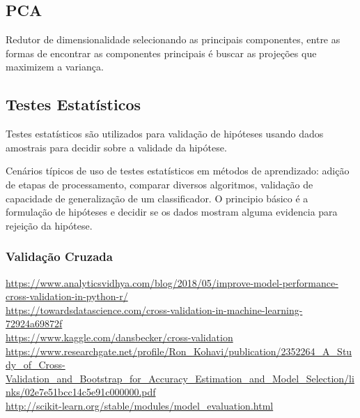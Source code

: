 \documentclass[12pt]{article}
\begin{document}
\subsection{PCA}

	Redutor de dimensionalidade selecionando as principais componentes, entre as formas de encontrar as componentes principais é buscar as projeções que maximizem a variança.
	
\subsection{Testes Estatísticos}

	Testes estatísticos são utilizados para validação de hipóteses usando dados amostrais para decidir sobre a validade da hipótese.
	
	Cenários típicos de uso de testes estatísticos em métodos de aprendizado: adição de etapas de processamento, comparar diversos algoritmos, validação de capacidade de generalização de um classificador. O principio básico é a formulação de hipóteses e decidir se os dados mostram alguma evidencia para rejeição da hipótese.
	

	\subsubsection{Validação Cruzada}
	
		\url{https://www.analyticsvidhya.com/blog/2018/05/improve-model-performance-cross-validation-in-python-r/}\\
		\url{https://towardsdatascience.com/cross-validation-in-machine-learning-72924a69872f}\\
		\url{https://www.kaggle.com/dansbecker/cross-validation}\\
		\url{https://www.researchgate.net/profile/Ron_Kohavi/publication/2352264_A_Study_of_Cross-Validation_and_Bootstrap_for_Accuracy_Estimation_and_Model_Selection/links/02e7e51bcc14c5e91c000000.pdf}\\
		\url{http://scikit-learn.org/stable/modules/model_evaluation.html}
		
\end{document}
